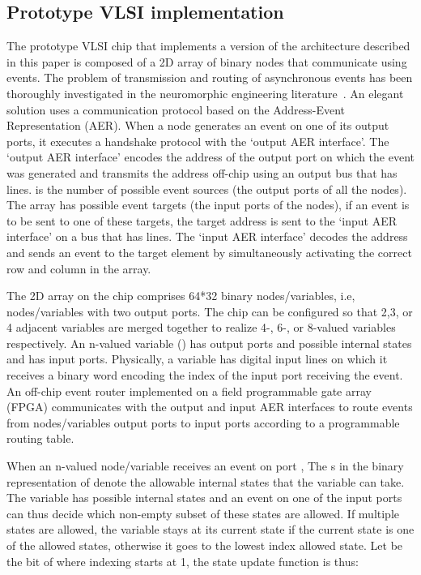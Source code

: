 \documentclass[10pt]{article}
\begin{document}
\subsection*{Prototype VLSI implementation}
The prototype VLSI chip that implements a version of the architecture described in this paper is composed of a 2D array of binary nodes that communicate using events. The problem of transmission and routing of asynchronous events has been thoroughly investigated in the neuromorphic engineering literature~\cite{Deiss_etal98,Boahen00}. An elegant solution uses a communication protocol based on the Address-Event Representation (AER). 
When a node generates an event on one of its output ports, it executes a handshake protocol with the `output AER interface'. The `output AER interface' encodes the address of the output port on which the event was generated and transmits the address off-chip using an output bus that has  lines.  is the number of possible event sources (the output ports of all the nodes). The array has  possible event targets (the input ports of the nodes), if an event is to be sent to one of these targets, the target address is sent to the `input AER interface' on a bus that has  lines. The `input AER interface' decodes the address and sends an event to the target element by simultaneously activating the correct row and column in the array.

The 2D array on the chip comprises 64*32 binary nodes/variables, i.e, nodes/variables with two output ports. The chip can be configured so that 2,3, or 4 adjacent variables are merged together to realize 4-, 6-, or 8-valued variables respectively. An n-valued variable () has  output ports and  possible internal states and has  input ports. Physically, a variable has  digital input lines on which it receives a binary word encoding the index of the input port receiving the event. 
An off-chip event router implemented on a field programmable gate array (FPGA) communicates with the output and input AER interfaces to route events from nodes/variables output ports to input ports according to a programmable routing table. 

When an n-valued node/variable receives an event on port , The s in the binary representation of  denote the allowable internal states that the variable can take. The variable has  possible internal states and an event on one of the   input ports can thus decide which non-empty subset of these states are allowed. If multiple states are allowed, the variable stays at its current state if the current state is one of the allowed states, otherwise it goes to the lowest index allowed state. Let  be the  bit of  where indexing starts at 1, the state update function  is thus:
\end{document}
